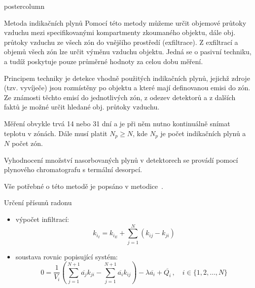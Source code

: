 \documentclass{beamer}
\begin{document}
\begin{frame}
\begin{columns}
\begin{column}{.43\textwidth}
\begin{beamercolorbox}[center]{postercolumn}
\begin{minipage}{.98\textwidth}
{\begin{myblock}{Metoda indikačních plynů}
    Pomocí této metody můžeme určit objemové průtoky vzduchu mezi specifikovanými kompartmenty zkoumaného objektu, dále obj. průtoky vzduchu ze všech zón do vnějšího prostředí (exfiltrace). Z exfiltrací a objemů všech zón lze určit výměnu vzduchu objektu. Jedná se o pasivní techniku, a tudíž poskytuje pouze průměrné hodnoty za celou dobu měření. 

Principem techniky je detekce vhodně použitých indikačních plynů, jejichž zdroje (tzv. vyvíječe) jsou rozmístěny po objektu a které mají definovanou emisi do zón. Ze známosti těchto emisí do jednotlivých zón, z odezev detektorů a z dalších faktů je možné určit hledané obj. průtoky vzduchu.

Měření obvykle trvá 14 nebo 31 dní a je při něm nutno kontinuálně snímat teplotu v zónách. Dále musí platit $N_p\geq N$, kde $N_p$ je počet indikačních plynů a $N$ počet zón.

Vyhodnocení množství nasorbovaných plynů v detektorech se provádí pomocí plynového chromatografu s termální desorpcí.

Vše potřebné o této metodě je popsáno v metodice~\cite{metodika}.
\end{myblock}\vfill

\begin{myblock}{Určení přísunů radonu}

\begin{itemize}
    \item výpočet infiltrací:
        \begin{equation}
            k_{i_I}=k_{i_E}+\sum_{j=1}^{N} \left(k_{ij}-k_{ji}\right)
            \label{eq:infiltrace}
        \end{equation}
    \item soustava rovnic popisující systém:
        \begin{equation}
            0=\frac{1}{V_i}\left( \sum^{N+1}_{j=1}\overline{a_j} k_{ji}-\sum^{N+1}_{j=1}\overline{a_i} k_{ij}\right)-\lambda \overline{a_i} +\overline{Q_i}\,,\quad i\in \{1,2,\ldots,N\}\label{eq:odvozovani_rovnovaha}
        \end{equation}
\end{itemize}


\end{myblock}}
\end{minipage}
\end{beamercolorbox}
\end{column}
\end{columns}
\end{frame}
\end{document}
